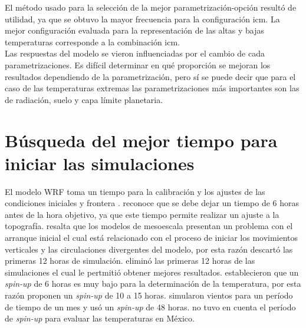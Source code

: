 \begin{itemize}


El método usado para la selección de la mejor parametrización-opción resultó de utilidad, ya que se obtuvo la mayor frecuencia para la configuración icm. La mejor configuración evaluada para la representación de las altas y bajas temperaturas corresponde a la combinación icm.\\

Las respuestas del modelo se vieron influenciadas por el cambio de cada parametrizaciones. Es difícil determinar en qué proporción se mejoran los resultados dependiendo de la parametrización, pero sí se puede decir que para el caso de las temperaturas extremas las parametrizaciones más importantes son las de radiación, suelo y capa límite planetaria.\\


\end{itemize} %


\section{Búsqueda del mejor tiempo para iniciar las simulaciones}

El modelo WRF toma un tiempo para la calibración y los ajustes de las condiciones iniciales y frontera \citep{Jimenez2014}. \citet{Skamarock2008} reconoce que se debe dejar un tiempo de 6 horas antes de la hora objetivo, ya que este tiempo permite realizar un ajuste a la topografía. \citet{cortes2010} resalta que los modelos de mesoescala presentan un problema con el arranque inicial el cual está relacionado con el proceso de iniciar los movimientos verticales y las circulaciones divergentes del modelo, por esta razón \citet{cortes2010} descartó las primeras 12 horas de simulación. \citet{Hu2010} eliminó las primeras 12 horas de las simulaciones el cual le pertmitió obtener mejores resultados. \citet{Arango2011} establecieron que un \textit{spin-up} de 6 horas es muy bajo para la determinación de la temperatura, por esta razón proponen un \textit{spin-up} de 10 a 15 horas. \citet{Draxl2007} simularon vientos para un período de tiempo de un mes y usó un \textit{spin-up} de 48 horas. \citet{Corrales2015} no tuvo en cuenta el período de \textit{spin-up} para evaluar las temperaturas en México.\\

